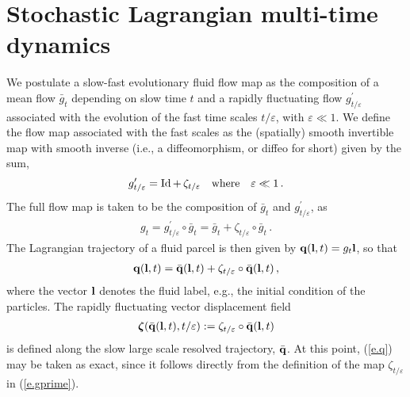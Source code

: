 \documentclass[12pt,onesided]{article}
\def\eps{\varepsilon}
\def\q{{\bf{q}}}
\def\l{{\bf{l}}}
\begin{document}
\section{Stochastic Lagrangian multi-time dynamics}
\label{sec.multiscale}
We postulate a slow-fast evolutionary fluid flow map as the composition of a mean flow $\bar g_t$ depending on slow time $t$ and a rapidly fluctuating flow $g_{t/\eps}^\prime$ associated with the evolution of the fast time scales $t/\eps$, with $\eps\ll1$. We define the flow map associated with the fast scales as the (spatially) smooth invertible map with smooth inverse (i.e., a diffeomorphism, or diffeo for short) given by the sum,
\begin{align}
g_{t/\eps}^\prime = \operatorname{Id} + \,{\zeta}_{t/\eps}
\quad\hbox{where}\quad \eps\ll1
\, .
\label{e.gprime}
\end{align}
%
The full flow map is taken to be the composition of $\bar g_t$ and $g_{t/\eps}^\prime$, as
\begin{align}
g_t = g_{t/\eps}^\prime\circ \bar g_t = \bar g_t + {\zeta}_{t/\eps}\circ \bar g_t\, .
\label{compmap}
\end{align}
The Lagrangian trajectory of a fluid parcel is then given by $\q(\l,t)=g_t\l$, so that
\begin{align}
\q(\l,t) = \bar{\q}(\l,t) + {\zeta}_{t/\eps}\circ \bar{\q}(\l,t)\,,
\label{e.q}
\end{align}
where the vector $\l$ denotes the fluid label, e.g., the initial condition of the particles. The rapidly fluctuating vector displacement field 
\begin{align}
\bm{\zeta}(\bar{\q}(\l,t),{t/\eps}):={\zeta}_{t/\eps}\circ \bar{\q}(\l,t)
\label{e.vdf}
\end{align}
is defined along the slow large scale resolved trajectory, $\bar\q$. At this point, (\ref{e.q}) may be taken as exact, since it follows directly from the definition of the map ${\zeta}_{t/\eps}$ in (\ref{e.gprime}). 
\end{document}
